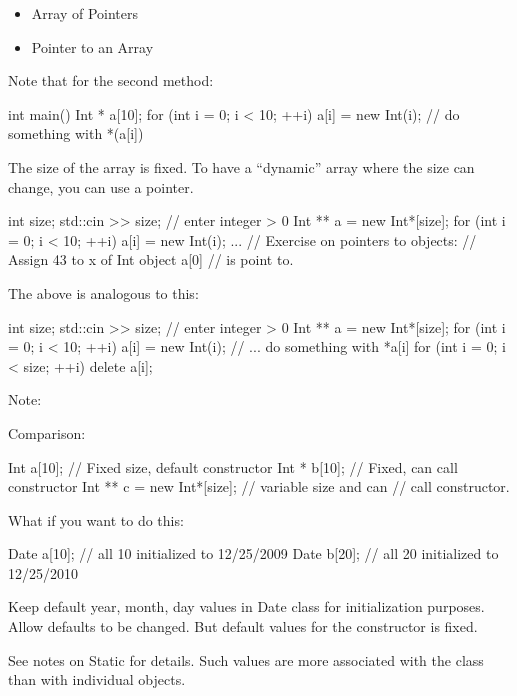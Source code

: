 \begin{itemize}
\item
  Array of Pointers
\item
  Pointer to an Array
\end{itemize}

Note that for the second method:

\begin{console}
int main()
{   
    Int * a[10];
    for (int i = 0; i < 10; ++i)
        a[i] = new Int(i);
    // do something with *(a[i])
}
\end{console}
The size of the array is fixed. To have a ``dynamic'' array where the
size can change, you can use a pointer.
\begin{console}
int size;
std::cin >> size; // enter integer > 0
Int ** a = new Int*[size];
for (int i = 0; i < 10; ++i)
    a[i] = new Int(i);
...
// Exercise on pointers to objects:
// Assign 43 to x of Int object a[0]
// is point to.
\end{console}
The above is analogous to this:
\begin{console}
int size;
std::cin >> size; // enter integer > 0
Int ** a = new Int*[size];
for (int i = 0; i < 10; ++i)
    a[i] = new Int(i);
    // ... do something with *a[i]
for (int i = 0; i < size; ++i)
    delete a[i];
\end{console}
Note:
Comparison:
\begin{console}
Int a[10];        // Fixed size, default constructor
Int * b[10];      // Fixed, can call constructor
Int ** c = new Int*[size]; // variable size and can
                           // call constructor.
\end{console}
What if you want to do this:
\begin{console}
Date a[10]; // all 10 initialized to 12/25/2009
Date b[20]; // all 20 initialized to 12/25/2010
\end{console}
Keep default year, month, day values in Date class for initialization
purposes. Allow defaults to be changed. But default values for the
constructor is fixed.

See notes on Static for details. Such values are more associated with
the class than with individual objects.

